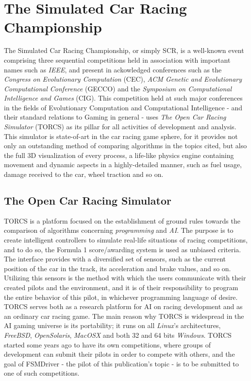 \section{The Simulated Car Racing Championship}

	The Simulated Car Racing Championship, or simply SCR, \cite{scr2009} is a well-known event comprising three sequential
	competitions held in association with important names such as \textit{IEEE}, and present in ackowledged conferences
	such as the \textit{Congress on Evolutionary Computation} (CEC), \textit{ACM Genetic and Evolutionary Computational
	Conference} (GECCO) and the \textit{Symposium on Computational Intelligence and Games} (CIG). This competition held at
	such major conferences in the fields of Evolutionary Computation and Computational Intelligence - and
	their standard relations to Gaming in general - uses \emph{The Open Car Racing Simulator} (TORCS) as its pillar for
	all activities of development and analysis. This simulator is state-of-art in the car racing game sphere, for it provides
	not only an outstanding method of comparing algorithms in the topics cited, but also the full 3D visualization of every
	process, a life-like physics engine containing movement and dynamic aspects in a highly-detailed manner, such as fuel
	usage, damage received to the car, wheel traction and so on.

\subsection{The Open Car Racing Simulator}

	TORCS is a platform focused on the establishment of ground rules towards the comparison of algorithms concerning
	\emph{programming} and \emph{AI}. The purpose is to create intelligent controllers to simulate real-life situations
	of racing competitions, and to do so, the Formula 1 score/awarding system is used as unbiased criteria.\\
	The interface provides with a diversified set of sensors, such as the current position of the car in the track, its
	acceleration and brake values, and so on. Utilizing this sensors is the method with which the users communicate with
	their created pilots and the environment, and it is of their responsibility to program the entire behavior of this pilot,
	in whichever programming language of desire.\\
	TORCS serves both as a research platform for AI on racing development and as an ordinary car racing game. The main reason
	why TORCS is widespread in the AI gaming universe is its portability; it runs on all \textit{Linux}'s architectures,
	\textit{FreeBSD}, \textit{OpenSolaris}, \textit{MacOSX} and both 32 and 64 bits \textit{Windows}. TORCS started some years
	ago to have its own competitions, where groups of development can submit their pilots in order to compete with others,
	and the goal of FSMDriver - the pilot of this publication's topic - is to be submitted to one of such competitions.

